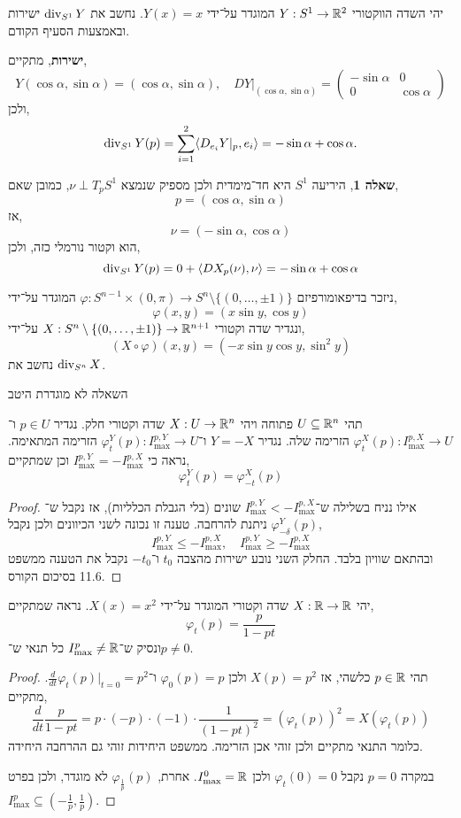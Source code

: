\question{}
\subquestion{}
יהי השדה הווקטורי $Y : S^1 \to \mathbb{R}^2$ המוגדר על־ידי $Y(x) = x$.
נחשב את $\operatorname{div}_{S^1} Y$ ישירות ובאמצעות הסעיף הקודם.
\begin{solution}
	\textbf{ישירות},
	מתקיים,
	\[
		Y(\cos \alpha, \sin \alpha)
		= (\cos \alpha, \sin \alpha),
		\quad
		D Y |_{(\cos \alpha, \sin \alpha)}
		= \begin{pmatrix}
			-\sin \alpha & 0 \\
			0 & \cos \alpha
		\end{pmatrix}
	\]
	ולכן,
	\[
		\operatorname{div}_{S^1} Y(p)
		= \sum_{i = 1}^2 \langle D_{e_i} Y |_p, e_i \rangle
		= -\sin \alpha + \cos \alpha
	.\]

	\textbf{שאלה 1},
	היריעה $S^1$ היא חד־מימדית ולכן מספיק שנמצא $\nu \perp T_p S^1$, כמובן שאם,
	\[
		p = (\cos \alpha, \sin \alpha)
	\]
	אז,
	\[
		\nu
		= (-\sin \alpha, \cos \alpha)
	\]
	הוא וקטור נורמלי כזה, ולכן,
	\[
		\operatorname{div}_{S^1} Y(p)
		= 0 + \langle D X_p(\nu), \nu \rangle
		= -\sin \alpha + \cos \alpha
	\]
\end{solution}

\subquestion{}
ניזכר בדיפאומורפיזם $\varphi : S^{n - 1} \times (0, \pi) \to S^n \setminus \{(0, \ldots, \pm 1)\}$ המוגדר על־ידי,
\[
	\varphi(x, y)
	= (x \sin y, \cos y)
\]
ונגדיר שדה וקטורי $X : S^n \setminus \{(0, \ldots, \pm 1)\} \to \mathbb{R}^{n + 1}$ על־ידי,
\[
	(X \circ \varphi)(x, y)
	= (- x \sin y \cos y, \sin^2 y)
\]
נחשב את $\operatorname{div}_{S^n} X$.
\begin{solution}
	השאלה לא מוגדרת היטב
\end{solution}

\question{}
\subquestion{}
תהי $U \subseteq \mathbb{R}^n$ פתוחה ויהי $X : U \to \mathbb{R}^n$ שדה וקטורי חלק.
נגדיר $p \in U$ ו־$\varphi_t^X(p) : I_{\max}^{p, X} \to U$ הזרימה שלה.
נגדיר $Y = -X$ ו־$\varphi_t^Y(p) : I_{\max}^{p, Y} \to U$ הזרימה המתאימה.
נראה כי $I_{\max}^{p, Y} = - I_{\max}^{p, X}$ וכן שמתקיים,
\[
	\varphi_t^Y(p)
	= \varphi_{-t}^X(p)
\]
\begin{proof}
	אילו נניח בשלילה ש־$I_{\max}^{p, Y} < - I_{\max}^{p, X}$ שונים (בלי הגבלת הכלליות),
	אז נקבל ש־$\varphi_{-\delta}^Y(p)$ ניתנת להרחבה.
	טענה זו נכונה לשני הכיוונים ולכן נקבל,
	\[
		I_{\max}^{p, Y} \le - I_{\max}^{p, X},
		\quad
		I_{\max}^{p, Y} \ge - I_{\max}^{p, X}
	\]
	ובהתאם שוויון בלבד.
	החלק השני נובע ישירות מהצבה $t_0$ ו־$-t_0$ נקבל את הטענה ממשפט 11.6 בסיכום הקורס.
\end{proof}

\subquestion{}
יהי $X : \mathbb{R} \to \mathbb{R}$ שדה וקטורי המוגדר על־ידי $X(x) = x^2$.
נראה שמתקיים,
\[
	\varphi_t(p) = \frac{p}{1 - pt}
\]
ונסיק ש־$I_{\max}^p \ne \mathbb{R}$ כל תנאי ש־$p \ne 0$.
\begin{proof}
	תהי $p \in \mathbb{R}$ כלשהי, אז $X(p) = p^2$ ולכן $\varphi_0(p) = p$ ו־$\frac{d}{dt} \varphi_t(p)|_{t = 0} = p^2$.
	מתקיים,
	\[
		\frac{d}{dt} \frac{p}{1 - pt}
		= p \cdot (-p) \cdot (-1) \cdot \frac{1}{{(1 - pt)}^2}
		= {(\varphi_t(p))}^2
		= X(\varphi_t(p))
	\]
	כלומר התנאי מתקיים ולכן זוהי אכן הזרימה.
	ממשפט היחידות זוהי גם ההרחבה היחידה.

	במקרה $p = 0$ נקבל $\varphi_t(0) = 0$ ולכן $I_{\max}^0 = \mathbb{R}$.
	אחרת, $\varphi_{\frac{1}{p}}(p)$ לא מוגדר, ולכן בפרט $I_{\max}^p \subseteq (-\frac{1}{p}, \frac{1}{p})$.
\end{proof}


